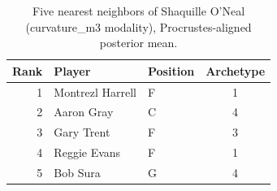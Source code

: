 \begin{table}[htbp]
  \centering\small
  \begin{tabular}{rllc}
    \toprule
    Rank & Player & Position & Archetype \\
    \midrule
    1 & Montrezl Harrell & F & 1 \\
    2 & Aaron Gray & C & 4 \\
    3 & Gary Trent & F & 3 \\
    4 & Reggie Evans & F & 1 \\
    5 & Bob Sura & G & 4 \\
    \bottomrule
  \end{tabular}
  \caption{Five nearest neighbors of Shaquille O'Neal (curvature_m3 modality), Procrustes-aligned posterior mean.}
  \label{tab:Shaquille_O_Neal_neighbors_curvature_m3}
\end{table}

